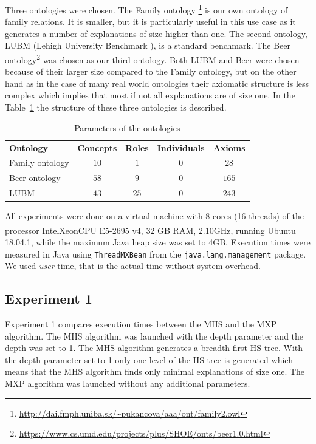 \documentclass[12pt,a4paper]{article}
\begin{document}
Three ontologies were chosen. The Family ontology
\footnote{\url{http://dai.fmph.uniba.sk/~pukancova/aaa/ont/family2.owl}} is our own ontology of family relations. It is smaller, but it is particularly useful in this use case as it generates a number of explanations of size higher than one. The second ontology, LUBM (Lehigh University Benchmark \cite{LUBM}), is a standard benchmark. The Beer ontology\footnote{\url{https://www.cs.umd.edu/projects/plus/SHOE/onts/beer1.0.html}} was chosen as our third ontology. Both LUBM and Beer were chosen because of their larger size compared to the Family ontology, but on the other hand as in the case of many real world ontologies their axiomatic structure is less complex which implies that most if not all explanations are of size one. In the Table~\ref{tab:ont} the structure of these three ontologies is described.

\begin{table}[h!]
	\centering
	\caption{Parameters of the ontologies}
	\label{tab:ont}
	\begin{tabular}{lcccc} 
		\addlinespace[0.3cm]
		\textbf{Ontology} & \textbf{Concepts} & \textbf{Roles} &
		\textbf{Individuals} & \textbf{Axioms} \\
		\addlinespace[0.3cm]
		Family ontology & $10$ & $1$ & $0$ & $28$\\
		\addlinespace[0.3cm]
		Beer ontology & $58$ & $9$ & $0$ & $165$\\
		\addlinespace[0.3cm]
		LUBM & $43$ & $25$ & $0$ & $243$
	\end{tabular}
\end{table}

All experiments were done on a virtual machine with 8 cores (16 threads) of
the processor Intel\textsuperscript \textregistered Xeon\textsuperscript
\textregistered CPU E5-2695 v4, 32 GB RAM, 2.10GHz, running Ubuntu 18.04.1,
while the maximum Java heap size was set to 4GB. Execution times were measured
in Java using \texttt{ThreadMXBean} from the \texttt{java.lang.management}
package. We used \emph{user} time, that is the actual time without system
overhead.

\subsection{Experiment 1}

Experiment 1 compares execution times between the MHS and the MXP algorithm. The MHS algorithm was launched with the depth parameter and the depth was set to 1. The MHS algorithm generates a breadth-first HS-tree. With the depth parameter set to 1 only one level of the HS-tree is generated which means that the MHS algorithm finds only minimal explanations of size one. The MXP algorithm was launched without any additional parameters.
\end{document}
